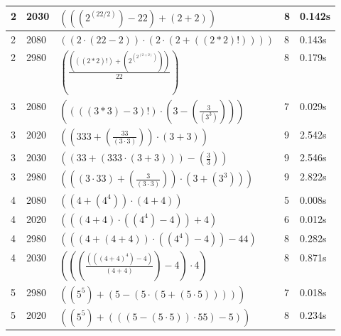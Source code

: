 \documentclass{article}
\theoremstyle{nonumberplain}
\begin{document}
\begin{center}
\begin{longtable}{ | l | l | p{7cm} | l | l | }
                2 & 2030 & \( \left(\left(\left({2}^{(22 / 2)}\right) - 22\right) + \left(2 + 2\right)\right) \) & 8 & 0.142s \\\hline
                2 & 2080 & \( \left(\left(2 \cdot \left(22 - 2\right)\right) \cdot \left(2 \cdot \left(2 + \left((2 * 2)!\right)\right)\right)\right) \) & 8 & 0.143s \\\hline
                2 & 2980 & \( \left(\frac{\left(\left((2 * 2)!\right) + \left({2}^{(2 ^ (2 + 2))}\right)\right)}{22}\right) \) & 8 & 0.179s \\\hline
                3 & 2080 & \( \left(\left(((3 * 3) - 3)!\right) \cdot \left(3 - \left(\frac{3}{\left({3}^{3}\right)}\right)\right)\right) \) & 7 & 0.029s \\\hline
                3 & 2020 & \( \left(\left(333 + \left(\frac{33}{\left(3 \cdot 3\right)}\right)\right) \cdot \left(3 + 3\right)\right) \) & 9 & 2.542s \\\hline
                3 & 2030 & \( \left(\left(33 + \left(333 \cdot \left(3 + 3\right)\right)\right) - \left(\frac{3}{3}\right)\right) \) & 9 & 2.546s \\\hline
                3 & 2980 & \( \left(\left(\left(3 \cdot 33\right) + \left(\frac{3}{\left(3 \cdot 3\right)}\right)\right) \cdot \left(3 + \left({3}^{3}\right)\right)\right) \) & 9 & 2.822s \\\hline
                4 & 2080 & \( \left(\left(4 + \left({4}^{4}\right)\right) \cdot \left(4 + 4\right)\right) \) & 5 & 0.008s \\\hline
                4 & 2020 & \( \left(\left(\left(4 + 4\right) \cdot \left(\left({4}^{4}\right) - 4\right)\right) + 4\right) \) & 6 & 0.012s \\\hline
                4 & 2980 & \( \left(\left(\left(4 + \left(4 + 4\right)\right) \cdot \left(\left({4}^{4}\right) - 4\right)\right) - 44\right) \) & 8 & 0.282s \\\hline
                4 & 2030 & \( \left(\left(\left(\frac{\left(\left({(4 + 4)}^{4}\right) - 4\right)}{\left(4 + 4\right)}\right) - 4\right) \cdot 4\right) \) & 8 & 0.871s \\\hline
                5 & 2980 & \( \left(\left({5}^{5}\right) + \left(5 - \left(5 \cdot \left(5 + \left(5 \cdot 5\right)\right)\right)\right)\right) \) & 7 & 0.018s \\\hline
                5 & 2020 & \( \left(\left({5}^{5}\right) + \left(\left(\left(5 - \left(5 \cdot 5\right)\right) \cdot 55\right) - 5\right)\right) \) & 8 & 0.234s \\\hline

\end{longtable}
\end{center}
\end{document}
